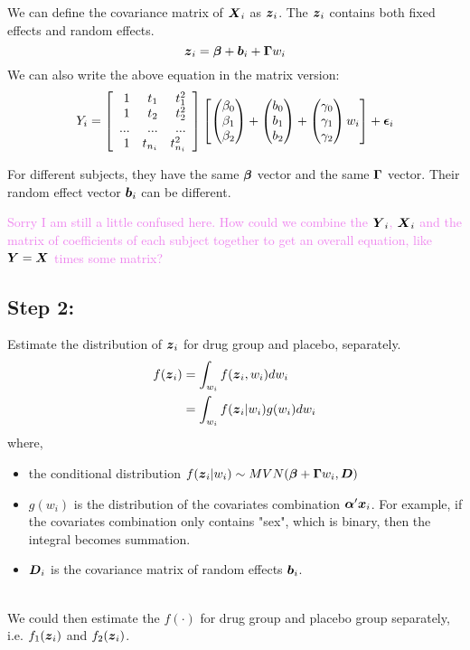 \documentclass[12pt]{article}
\newcommand{\kate}[1]{{\textcolor{violet}{#1}}}
\begin{document}
We can define the covariance matrix of $\mbox{\boldmath $X$}_i$ as $\mbox{\boldmath $z$}_i$. The $\mbox{\boldmath $z$}_i$ contains both fixed effects and random effects. 
$$\mbox{\boldmath $z$}_i = \mbox{\boldmath $\beta$} + \mbox{\boldmath $b$}_i + \mbox{\boldmath $\Gamma$} w_i$$
We can also write the above equation in the matrix version:
$$Y_i = \left[\begin{array}
{rrr}
1 & t_1 & t_1^2 \\
1 & t_2 & t_2^2 \\
... & ... & ... \\
1 & t_{n_i} & t_{n_i}^2
\end{array}\right]
\left[\begin{pmatrix}
\beta_0 \\
\beta_1 \\
\beta_2
\end{pmatrix} +  
\begin{pmatrix}
b_0 \\
b_1 \\
b_2
\end{pmatrix} + 
\begin{pmatrix}
\gamma_0 \\
\gamma_1 \\
\gamma_2
\end{pmatrix} w_i \right] + \mbox{\boldmath $\epsilon$}_i$$

For different subjects, they have the same $\mbox{\boldmath $\beta$}$ vector and the same $\mbox{\boldmath $\Gamma$}$ vector. Their random effect vector $\mbox{\boldmath $b$}_i$ can be different.

\kate{Sorry I am still a little confused here. How could we combine the $\mbox{\boldmath $Y$}_i$, $\mbox{\boldmath $X$}_i$ and the matrix of coefficients of each subject together to get an overall equation, like $\mbox{\boldmath $Y$} = \mbox{\boldmath $X$}$ times some matrix?}

\subsection{Step 2:}

Estimate the distribution of $\mbox{\boldmath $z$}_i$ for drug group and placebo, separately.
$$\begin{aligned}
f(\mbox{\boldmath $z$}_i) &= \int_{w_i} f(\mbox{\boldmath $z$}_i,w_i) dw_i \\
 & = \int_{w_i} f(\mbox{\boldmath $z$}_i|w_i) g(w_i) dw_i
\end{aligned}$$
where,
\begin{itemize}
\item
 the conditional distribution 
$f(\mbox{\boldmath $z$}_i|w_i) \sim MVN( \mbox{\boldmath $\beta$} + \mbox{\boldmath $\Gamma$} w_i, \mbox{\boldmath $D$})$

\item
$g(w_i)$ is the distribution of the covariates combination $\mbox{\boldmath $\alpha$}'\mbox{\boldmath $x$}_i$. For example, if the covariates combination only contains "sex", which is binary, then the integral becomes summation.

\item
 $\mbox{\boldmath $D$}_i$ is the covariance matrix of random effects $\mbox{\boldmath $b$}_i$. 
\end{itemize}
~\\
\noindent
We could then estimate the $f(\cdot)$ for drug group and placebo group separately, i.e. $f_1(\mbox{\boldmath $z$}_i)$ and $f_2(\mbox{\boldmath $z$}_i)$. 
\end{document}
